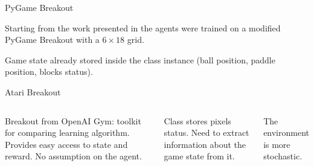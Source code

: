\begin{frame}{PyGame Breakout}
	\begin{block}{}
	Starting from the work presented in \cite{DBLP:journals/corr/abs-1807-06333} the agents were trained on a modified PyGame Breakout with a $6\times18$ grid.
	\end{block}
	
	\begin{block}{}
	Game state already stored inside the class instance (ball position, paddle position, blocks status).
	\end{block}
	
\end{frame}

\begin{frame}{Atari Breakout}
    \begin{columns}[c,onlytextwidth]
	        \begin{block}{}
            Breakout from OpenAI Gym: toolkit for comparing learning algorithm. Provides easy access to state and reward. No assumption on the agent.
            \end{block}
        
	        \begin{block}{}
	        	Class stores pixels status. Need to extract information about the game state from it.
	        \end{block}

            \begin{block}{}
	            The environment is more stochastic.
			\end{block}
		

\end{columns}
\end{frame}
